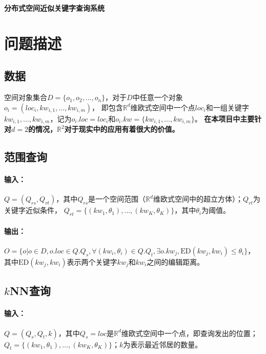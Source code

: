 \documentclass{ML}
\begin{document}
\maketitle

\tableofcontents
\newpage

\begin{center}
  \textbf{ 分布式空间近似关键字查询系统}
\end{center}

\section{问题描述}
\subsection{数据}\label{sec:data}
空间对象集合$D = \{o_1, o_2, \dots, o_n\}$，对于$D$中任意一个对象$o_i = (loc_i, kw_{i, 1}, \dots, kw_{i, m})$，
即包含$\mathbb{R}^d$维欧式空间中一个点$loc_i$和一组关键字$kw_{i, 1}, \dots, kw_{i, m}$，记为$o_i.loc = loc_i$和$o_i.kw = \{kw_{i, 1}, \dots, kw_{i, m}\}$。
\textbf{在本项目中主要针对$d = 2$的情况，$\mathbb{R}^2$对于现实中的应用有着很大的价值。}

\subsection{范围查询}\label{sec:range-query}
\paragraph{输入：}$Q = (Q_{rs}, Q_{rt})$，其中$Q_{rs}$是一个空间范围（$\mathbb{R}^d$维欧式空间中的超立方体）；$Q_{rt}$为关键字近似条件，
$Q_{rt} = \{(kw_1, \theta_1), \dots, (kw_K, \theta_K)\}$，其中$\theta_i$为阈值。
\paragraph{输出：}$O = \{o | o \in D, o.loc \in Q.Q_s, \forall(kw_i, \theta_i) \in Q.Q_t, \exists o.kw_j, \mathrm{ED}(kw_j, kw_i) \leq \theta_i\}$，
其中$\mathrm{ED}(kw_j, kw_i)$表示两个关键字$kw_j$和$kw_i$之间的编辑距离。

\subsection{$k$NN查询}\label{sec:knn_query}
\paragraph{输入：} $Q = (Q_s, Q_t, k)$，其中$Q_s = loc$是$\mathbb{R}^d$维欧式空间中一个点，即查询发出的位置；
$Q_t = \{(kw_1, \theta_1), \dots, (kw_K, \theta_K)\}$；$k$为表示最近邻居的数量。
\end{document}
